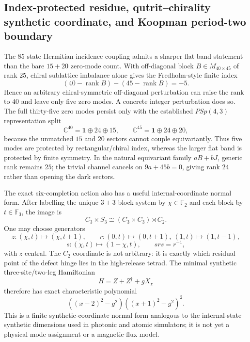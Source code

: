 \subsection{Index-protected residue, qutrit--chirality synthetic coordinate, and Koopman period-two boundary}

The $85$-state Hermitian incidence coupling admits a sharper flat-band statement than the
bare $15+20$ zero-mode count.  With off-diagonal block $B\in M_{40\times45}$ of rank $25$,
chiral sublattice imbalance alone gives the Fredholm-style finite index
\[
 (40-\operatorname{rank}B)-(45-\operatorname{rank}B)=-5.
\]
Hence an arbitrary chiral-symmetric off-diagonal perturbation can raise the rank to $40$
and leave only five zero modes.  A concrete integer perturbation does so.  The full
thirty-five zero modes persist only with the established $PSp(4,3)$ representation split
\[
 \mathbb C^{40}=\mathbf1\oplus24\oplus15,
 \qquad
 \mathbb C^{45}=\mathbf1\oplus24\oplus20,
\]
because the unmatched $15$ and $20$ sectors cannot couple equivariantly.  Thus five modes
are protected by rectangular/chiral index, whereas the larger flat band is protected by
finite symmetry.  In the natural equivariant family $aB+bJ$, generic rank remains $25$;
the trivial channel cancels on $9a+45b=0$, giving rank $24$ rather than opening the dark
sectors.

The exact six-completion action also has a useful internal-coordinate normal form.  After
labelling the unique $3+3$ block system by $\chi\in\mathbb F_2$ and each block by
$t\in\mathbb F_3$, the image is
\[
 C_3\times S_3\cong(C_3\times C_3)\rtimes C_2.
\]
One may choose generators
\[
 z:(\chi,t)\mapsto(\chi,t+1),\qquad
 r:(0,t)\mapsto(0,t+1),\ (1,t)\mapsto(1,t-1),
\]
\[
 s:(\chi,t)\mapsto(1-\chi,t),
 \qquad srs=r^{-1},
\]
with $z$ central.  The $C_2$ coordinate is not arbitrary: it is exactly which residual
point of the defect hinge lies in the high-release tetrad.  The minimal synthetic
three-site/two-leg Hamiltonian
\[
 H=Z+Z^\dagger+gX_\chi
\]
therefore has exact characteristic polynomial
\[
 \boxed{((x-2)^2-g^2)((x+1)^2-g^2)^2}.
\]
This is a finite synthetic-coordinate normal form analogous to the internal-state synthetic
dimensions used in photonic and atomic simulators; it is not yet a physical mode assignment
or a magnetic-flux model.


